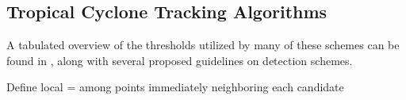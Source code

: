 \documentclass[gmdd, hvmath, online]{copernicus_discussions}
\begin{document}
\conclusions


\pagebreak
\begin{acknowledgements}

\end{acknowledgements}
\pagebreak


\appendix
\subsection{Tropical Cyclone Tracking Algorithms} \label{sec:TropicalCycloneAlgorithms}

A tabulated overview of the thresholds utilized by many of these schemes can be found in \cite{walsh2007objectively}, along with several proposed guidelines on detection schemes.

{\color{red}Define local = among points immediately neighboring each candidate}
\end{document}
